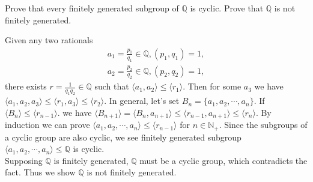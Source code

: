 \documentclass[12pt,letterpaper,boxed]{hmcpset}
\newcommand{\Q}{\mathbb{Q}}
\newcommand{\N}{\mathbb{N}}
\begin{document}
\begin{problem}[6.9]
Prove that every finitely generated subgroup of $\Q$ is cyclic. Prove that $\Q$ is not finitely generated.
\end{problem}
\begin{solution}	
Given any two rationals  
\begin{align*}
a_1=\frac{p_1}{q_1}\in \Q,(p_1,q_1)=1,  \\
a_2=\frac{p_2}{q_2}\in \Q,(p_2,q_2)=1 ,  
\end{align*}	
there exists $r=\frac{1}{q_1q_2}\in \Q$ such that $\langle a_1,a_2\rangle\le\langle r_1\rangle$. Then for some $a_3$ we have
$\langle a_1,a_2,a_3\rangle\le\langle r_1,a_3\rangle\le\langle r_2\rangle$. In general, let's set $B_n=\{a_1,a_2,\cdots,a_n\}$. If $\langle B_n\rangle\le\langle r_{n-1}\rangle$. we have $\langle B_{n+1}\rangle=\langle B_n,a_{n+1}\rangle\le\langle r_{n-1},a_{n+1}\rangle\le\langle r_n\rangle$. By induction we can prove $\langle a_1,a_2,\cdots,a_n\rangle\le\langle r_{n-1}\rangle
$ for $n\in\N_+$. Since the subgroups of a cyclic group are also cyclic, we see finitely generated subgroup $\langle a_1,a_2,\cdots,a_n\rangle\le\mathbb{Q}$ is cyclic.\\
Supposing $\mathbb{Q}$ is finitely generated, $\mathbb{Q}$ must be a cyclic group, which contradicts the fact. Thus we show $\mathbb{Q}$ is not finitely generated.
\end{solution}	
	
\end{document}

